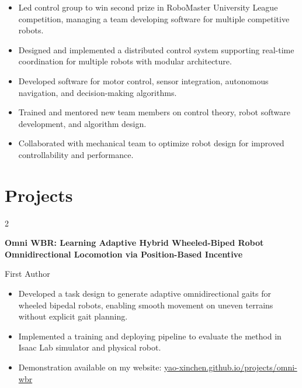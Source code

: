 \documentclass[10pt, letterpaper]{article}
\newenvironment{highlights}{
    \begin{itemize}[
        topsep=0.10 cm,
        parsep=0.10 cm,
        partopsep=0pt,
        itemsep=0pt,
        leftmargin=0 cm + 10pt
    ]
}{
    \end{itemize}
} %
\newenvironment{twocolentry}[2][]{
    \onecolentry
    \def\secondColumn{#2}
    \setcolumnwidth{\fill, 4.5 cm}
    \begin{paracol}{2}
}{
    \switchcolumn \raggedleft \secondColumn
    \end{paracol}
    \endonecolentry
} %
\begin{document}
        \vspace{0.10 cm}

        \begin{highlights}
            \item Led control group to win second prize in RoboMaster University League competition, managing a team developing software for multiple competitive robots.
            \item Designed and implemented a distributed control system supporting real-time coordination for multiple robots with modular architecture.
            \item Developed software for motor control, sensor integration, autonomous navigation, and decision-making algorithms.
            \item Trained and mentored new team members on control theory, robot software development, and algorithm design.
            \item Collaborated with mechanical team to optimize robot design for improved controllability and performance.
        \end{highlights}

    \section{Projects}

        \begin{twocolentry}{
            First Author
        }
            \textbf{Omni WBR: Learning Adaptive Hybrid Wheeled-Biped Robot Omnidirectional Locomotion via Position-Based Incentive}
        \end{twocolentry}

        \vspace{0.10 cm}
        \begin{highlights}
            \item Developed a task design to generate adaptive omnidirectional gaits for wheeled bipedal robots, enabling smooth movement on uneven terrains without explicit gait planning.
            \item Implemented a training and deploying pipeline to evaluate the method in Isaac Lab simulator and physical robot.
            \item Demonstration available on my website: \href{https://yao-xinchen.github.io/projects/omni-wbr/}{yao-xinchen.github.io/projects/omni-wbr}
        \end{highlights}

        \vspace{0.2 cm}
\end{document}
